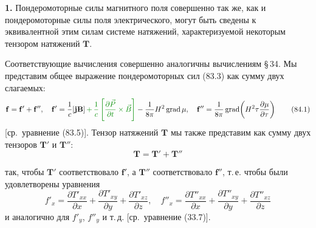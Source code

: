 \documentclass[a4paper,10pt]{article}
\newcommand{\modmath}[1]{\textcolor{modcolor}{#1}}
\begin{document}

\textbf{1.} Пондеромоторные силы магнитного поля совершенно так же,
как и пондеромоторные силы поля электрического, могут быть сведены
к эквивалентной этим силам системе натяжений, характеризуемой некоторым
тензором натяжений $\mathbf{T}$.

Соответствующие вычисления совершенно аналогичны вычислениям §\,34.
Мы представим общее выражение пондеромоторных сил (83.3) как сумму
двух слагаемых:
\begin{equation}
    \mathbf{f} = \mathbf{f}' + \mathbf{f}'', \quad
    \mathbf{f}' = \frac{1}{c}[\mathbf{j}\mathbf{B}]
                \modmath{\,+\,\frac{1}{c}\left[\frac{\partial\vec{P}}{\partial t} \times \vec{B}\right]}
               - \frac{1}{8\pi}H^2\operatorname{grad}\mu, \quad
    \mathbf{f}'' = \frac{1}{8\pi}\operatorname{grad}\!\left(
        H^2\tau\frac{\partial\mu}{\partial\tau}
    \right)
    \tag{84.1}
\end{equation}
[ср.\ уравнение (83.5)]. Тензор натяжений $\mathbf{T}$ мы также
представим как сумму двух тензоров $\mathbf{T}'$ и $\mathbf{T}''$:
\begin{equation}
    \mathbf{T} = \mathbf{T}' + \mathbf{T}''
    \tag{84.2}
\end{equation}


так, чтобы $\mathbf{T}'$ соответствовало $\mathbf{f}'$, а $\mathbf{T}''$
соответствовало $\mathbf{f}''$, т.\,е. чтобы были удовлетворены уравнения
\begin{equation}
    f'_x = \frac{\partial T'_{xx}}{\partial x}
          + \frac{\partial T'_{xy}}{\partial y}
          + \frac{\partial T'_{xz}}{\partial z}, \quad
    f''_x = \frac{\partial T''_{xx}}{\partial x}
           + \frac{\partial T''_{xy}}{\partial y}
           + \frac{\partial T''_{xz}}{\partial z}
    \tag{84.3}
\end{equation}
и аналогично для $f'_y$, $f''_y$ и т.\,д. [ср.\ уравнение (33.7)].
\end{document}
